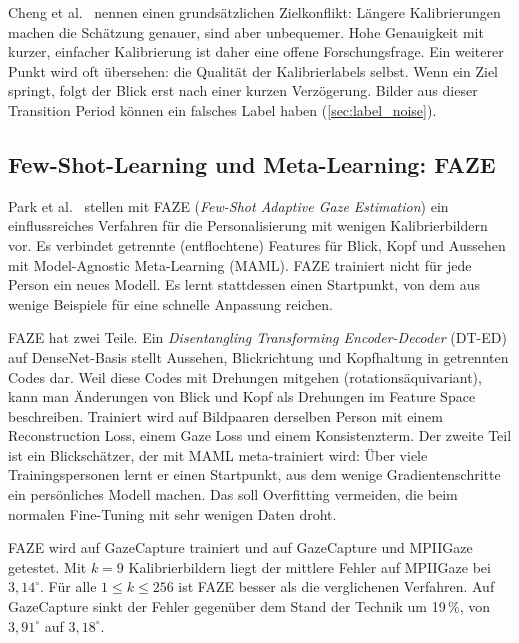 Cheng et al.~\cite{cheng2024review} nennen einen grundsätzlichen
Zielkonflikt: Längere Kalibrierungen machen die Schätzung genauer, sind aber
unbequemer. Hohe Genauigkeit mit kurzer, einfacher Kalibrierung ist daher eine
offene Forschungsfrage. Ein weiterer Punkt wird oft übersehen: die Qualität der
Kalibrierlabels selbst. Wenn ein Ziel springt, folgt der Blick erst nach einer
kurzen Verzögerung. Bilder aus dieser Transition Period können ein falsches Label
haben (\cref{sec:label_noise}).

\subsection{Few-Shot-Learning und Meta-Learning: FAZE}
\label{subsec:faze}
Park et al.~\cite{park2019faze} stellen mit FAZE (\emph{Few-Shot Adaptive Gaze
Estimation}) ein einflussreiches Verfahren für die Personalisierung mit wenigen
Kalibrierbildern vor. Es verbindet getrennte (entflochtene) Features für Blick,
Kopf und Aussehen mit Model-Agnostic Meta-Learning (MAML). FAZE trainiert nicht
für jede Person ein neues Modell. Es lernt stattdessen einen Startpunkt, von
dem aus wenige Beispiele für eine schnelle Anpassung reichen.

FAZE hat zwei Teile. Ein \emph{Disentangling Transforming Encoder-Decoder}
(DT-ED) auf DenseNet-Basis stellt Aussehen, Blickrichtung und Kopfhaltung in
getrennten Codes dar. Weil diese Codes mit Drehungen mitgehen
(rotationsäquivariant), kann man Änderungen von Blick und Kopf als Drehungen im
Feature Space beschreiben. Trainiert wird auf Bildpaaren derselben Person mit
einem Reconstruction Loss, einem Gaze Loss und einem Konsistenzterm. Der
zweite Teil ist ein Blickschätzer, der mit MAML meta-trainiert wird: Über viele
Trainingspersonen lernt er einen Startpunkt, aus dem wenige Gradientenschritte
ein persönliches Modell machen. Das soll Overfitting vermeiden, die beim
normalen Fine-Tuning mit sehr wenigen Daten droht.

FAZE wird auf GazeCapture trainiert und auf GazeCapture und MPIIGaze getestet.
Mit $k = 9$ Kalibrierbildern liegt der mittlere Fehler auf MPIIGaze bei
$3,14^\circ$. Für alle $1 \le k \le 256$ ist FAZE besser als die verglichenen
Verfahren. Auf GazeCapture sinkt der Fehler gegenüber dem Stand der Technik um
19\,\%, von $3,91^\circ$ auf $3,18^\circ$.

